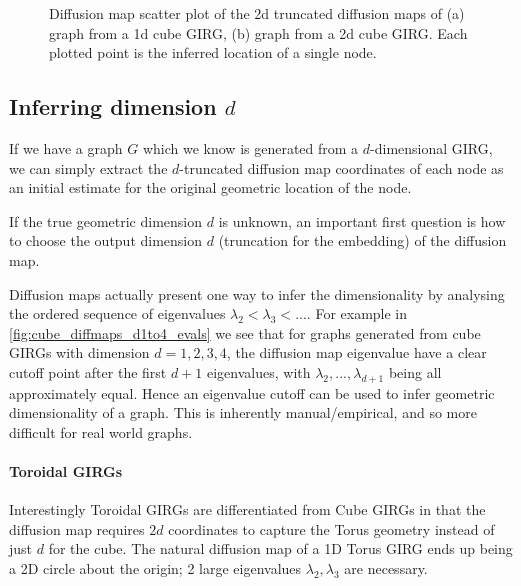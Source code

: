 \begin{figure}
  \caption{Diffusion map scatter plot of the 2d truncated diffusion maps of (a) graph from a 1d cube GIRG, (b) graph from a 2d cube GIRG. Each plotted point is the inferred location of a single node. }
  \label{fig:cube_diffmap_plots_d1and2}
\end{figure}

\subsection{Inferring dimension $d$}
If we have a graph $G$ which we know is generated from a $d$-dimensional GIRG, we can simply extract the $d$-truncated diffusion map coordinates of each node as an initial estimate for the original geometric location of the node. 

If the true geometric dimension $d$ is unknown, an important first question is how to choose the output dimension $d$ (truncation for the embedding) of the diffusion map.

Diffusion maps actually present one way to infer the dimensionality by analysing the ordered sequence of eigenvalues $\lambda_2 < \lambda_3 < ...$. For example in \cref{fig:cube_diffmaps_d1to4_evals} we see that for graphs generated from cube GIRGs with dimension $d=1,2,3,4$, the diffusion map eigenvalue have a clear cutoff point after the first $d+1$ eigenvalues, with $\lambda_2, ..., \lambda_{d+1}$ being all approximately equal. Hence an eigenvalue cutoff can be used to infer geometric dimensionality of a graph. This is inherently manual/empirical, and so more difficult for real world graphs.

\paragraph{Toroidal GIRGs} Interestingly Toroidal GIRGs are differentiated from Cube GIRGs in that the diffusion map requires $2d$ coordinates to capture the Torus geometry instead of just $d$ for the cube. The natural diffusion map of a 1D Torus GIRG ends up being a 2D circle about the origin; 2 large eigenvalues $\lambda_2, \lambda_3$ are necessary. 





